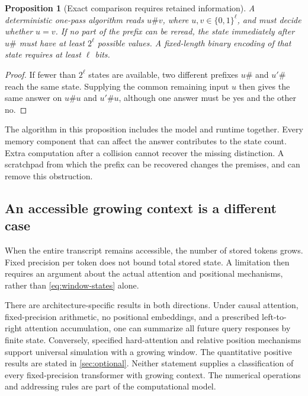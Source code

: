 \documentclass[11pt,twoside]{article}
\newtheorem{proposition}[theorem]{Proposition}
\theoremstyle{definition}
\theoremstyle{remark}
\begin{document}
\begin{proposition}[Exact comparison requires retained information]
\label{prop:equality-stream}
A deterministic one-pass algorithm reads $u\#v$, where
$u,v\in\{0,1\}^{\ell}$, and must decide whether $u=v$. If no part of the
prefix can be reread, the state immediately after $u\#$ must have at least
$2^\ell$ possible values. A fixed-length binary encoding of that state
requires at least $\ell$ bits.
\end{proposition}
\begin{proof}
If fewer than $2^\ell$ states are available, two different prefixes
$u\#$ and $u'\#$ reach the same state. Supplying the common remaining input
$u$ then gives the same answer on $u\#u$ and $u'\#u$, although one answer
must be yes and the other no.
\end{proof}

The algorithm in this proposition includes the model and runtime together.
Every memory component that can affect the answer contributes to the state
count. Extra computation after a collision cannot recover the missing
distinction. A scratchpad from which the prefix can be recovered changes
the premises, and can remove this obstruction.

\subsection{An accessible growing context is a different case}

When the entire transcript remains accessible, the number of stored tokens
grows. Fixed precision per token does not bound total stored state. A
limitation then requires an argument about the actual attention and
positional mechanisms, rather than \eqref{eq:window-states} alone.

There are architecture-specific results in both directions. Under
causal attention, fixed-precision arithmetic, no positional embeddings, and a prescribed
left-to-right attention accumulation, one can summarize all future query
responses by finite state.
Conversely, specified hard-attention and relative
position mechanisms support universal simulation with a growing window.
The quantitative positive results are stated in \cref{sec:optional}.
Neither statement supplies a classification of every fixed-precision
transformer with growing context. The numerical operations and addressing
rules are part of the computational model.
\end{document}
